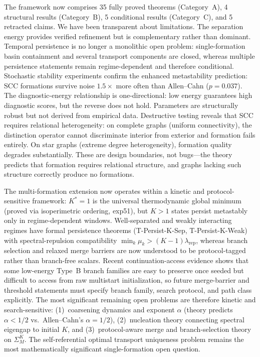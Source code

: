 \documentclass[lettersize,journal]{IEEEtran}
\begin{document}
The framework now comprises 35 fully proved theorems (Category~A), 4 structural results (Category~B), 5 conditional results (Category~C), and 5 retracted claims. We have been transparent about limitations. The separation energy provides verified refinement but is complementary rather than dominant. Temporal persistence is no longer a monolithic open problem: single-formation basin containment and several transport components are closed, whereas multiple persistence statements remain regime-dependent and therefore conditional. Stochastic stability experiments confirm the enhanced metastability prediction: SCC formations survive noise $1.5\times$ more often than Allen--Cahn ($p = 0.037$). The diagnostic-energy relationship is one-directional: low energy guarantees high diagnostic scores, but the reverse does not hold. Parameters are structurally robust but not derived from empirical data. Destructive testing reveals that SCC requires relational heterogeneity: on complete graphs (uniform connectivity), the distinction operator cannot discriminate interior from exterior and formation fails entirely. On star graphs (extreme degree heterogeneity), formation quality degrades substantially. These are design boundaries, not bugs---the theory predicts that formation requires relational structure, and graphs lacking such structure correctly produce no formations.

The multi-formation extension now operates within a kinetic and protocol-sensitive framework: $K^* = 1$ is the universal thermodynamic global minimum (proved via isoperimetric ordering, exp51), but $K > 1$ states persist metastably only in regime-dependent windows. Well-separated and weakly interacting regimes have formal persistence theorems (T-Persist-K-Sep, T-Persist-K-Weak) with spectral-repulsion compatibility $\min_k \mu_k > (K{-}1)\lambda_{\mathrm{rep}}$, whereas branch selection and relaxed merge barriers are now understood to be protocol-tagged rather than branch-free scalars. Recent continuation-access evidence shows that some low-energy Type~B branch families are easy to preserve once seeded but difficult to access from raw multistart initialization, so future merge-barrier and threshold statements must specify branch family, search protocol, and path class explicitly. The most significant remaining open problems are therefore kinetic and search-sensitive: (1)~coarsening dynamics and exponent $\alpha$ (theory predicts $\alpha < 1/2$ vs.\ Allen--Cahn's $\alpha = 1/2$), (2)~nucleation theory connecting spectral eigengap to initial $K$, and (3)~protocol-aware merge and branch-selection theory on $\Sigma^K_M$. The self-referential optimal transport uniqueness problem remains the most mathematically significant single-formation open question.
\end{document}
